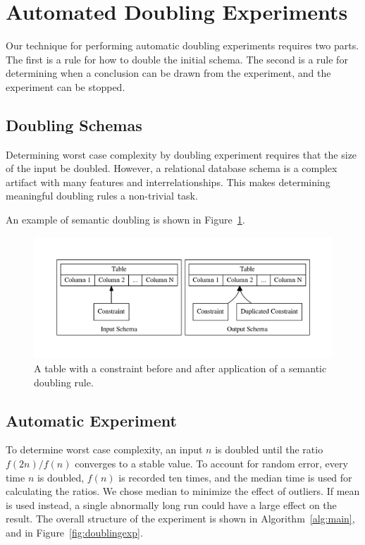 \section{Automated Doubling Experiments}

  Our technique for performing automatic doubling experiments requires
  two parts.  The first is a rule for how to double the initial schema.
  The second is a rule for determining when a conclusion can be drawn
  from the experiment, and the experiment can be stopped. 

  \subsection{Doubling Schemas}

  Determining worst case complexity by doubling experiment requires that
  the size of the input be doubled.  However, a relational database
  schema is a complex artifact with many features and
  interrelationships. This makes determining meaningful doubling rules a 
  non-trivial task.

  An example of semantic doubling is shown in
  Figure~\ref{fig:semanticconstraint}.


\begin{figure}
\centering
  \centering
  \includegraphics[width=.5\linewidth]{../diagrams/semanticconstraint.pdf}
  \caption{A table with a constraint before and after application of a semantic
  doubling rule.}
  \label{fig:semanticconstraint}
\end{figure}


  \subsection{Automatic Experiment}

To determine worst case complexity, an input $n$ is doubled until the 
ratio $f(2n) / f(n)$ converges to a stable value. To account for random
error, every time $n$ is doubled, $f(n)$ is recorded ten times, and the
median time is used for calculating the ratios.  We chose
median to minimize the effect of outliers. If mean is used instead, a
single abnormally long run could have a large effect on the result. The overall 
structure of the experiment is shown in Algorithm~\ref{alg:main}, and in
Figure~\ref{fig:doublingexp}.

